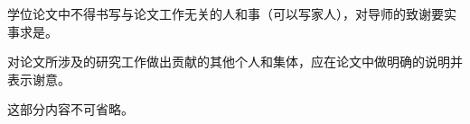 
\begin{acknowledgment}

学位论文中不得书写与论文工作无关的人和事（可以写家人），对导师的致谢要实事求是。

对论文所涉及的研究工作做出贡献的其他个人和集体，应在论文中做明确的说明并表示谢意。

这部分内容不可省略。

\end{acknowledgment}


